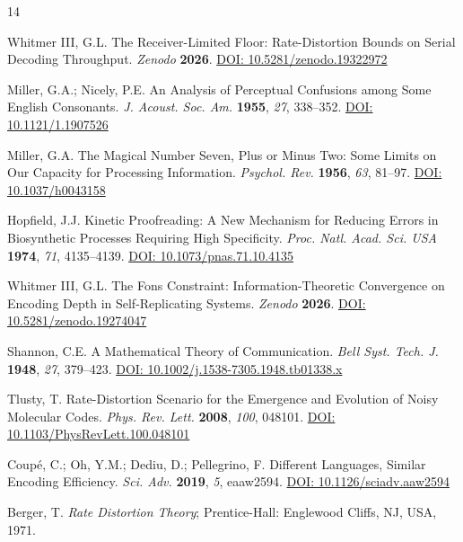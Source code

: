 \documentclass[11pt]{article}
\begin{document}
\begin{thebibliography}{14}

Whitmer III, G.L.
The Receiver-Limited Floor: Rate-Distortion Bounds on Serial Decoding Throughput.
\textit{Zenodo} \textbf{2026}.
\href{https://doi.org/10.5281/zenodo.19322972}{DOI: 10.5281/zenodo.19322972}

Miller, G.A.; Nicely, P.E.
An Analysis of Perceptual Confusions among Some English Consonants.
\textit{J. Acoust. Soc. Am.} \textbf{1955}, \textit{27}, 338--352.
\href{https://doi.org/10.1121/1.1907526}{DOI: 10.1121/1.1907526}

Miller, G.A.
The Magical Number Seven, Plus or Minus Two: Some Limits on Our Capacity for Processing Information.
\textit{Psychol. Rev.} \textbf{1956}, \textit{63}, 81--97.
\href{https://doi.org/10.1037/h0043158}{DOI: 10.1037/h0043158}

Hopfield, J.J.
Kinetic Proofreading: A New Mechanism for Reducing Errors in Biosynthetic Processes Requiring High Specificity.
\textit{Proc. Natl. Acad. Sci. USA} \textbf{1974}, \textit{71}, 4135--4139.
\href{https://doi.org/10.1073/pnas.71.10.4135}{DOI: 10.1073/pnas.71.10.4135}

Whitmer III, G.L.
The Fons Constraint: Information-Theoretic Convergence on Encoding Depth in Self-Replicating Systems.
\textit{Zenodo} \textbf{2026}.
\href{https://doi.org/10.5281/zenodo.19274047}{DOI: 10.5281/zenodo.19274047}

Shannon, C.E.
A Mathematical Theory of Communication.
\textit{Bell Syst. Tech. J.} \textbf{1948}, \textit{27}, 379--423.
\href{https://doi.org/10.1002/j.1538-7305.1948.tb01338.x}{DOI: 10.1002/j.1538-7305.1948.tb01338.x}

Tlusty, T.
Rate-Distortion Scenario for the Emergence and Evolution of Noisy Molecular Codes.
\textit{Phys. Rev. Lett.} \textbf{2008}, \textit{100}, 048101.
\href{https://doi.org/10.1103/PhysRevLett.100.048101}{DOI: 10.1103/PhysRevLett.100.048101}

Coup\'{e}, C.; Oh, Y.M.; Dediu, D.; Pellegrino, F.
Different Languages, Similar Encoding Efficiency.
\textit{Sci. Adv.} \textbf{2019}, \textit{5}, eaaw2594.
\href{https://doi.org/10.1126/sciadv.aaw2594}{DOI: 10.1126/sciadv.aaw2594}

Berger, T.
\textit{Rate Distortion Theory};
Prentice-Hall: Englewood Cliffs, NJ, USA, 1971.


\end{thebibliography}
\end{document}
